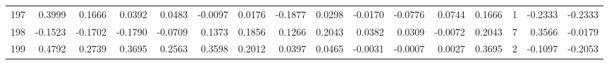\begin{tabular}{lrrrrrrrrrrrrrrr}
197 &      0.3999 &  0.1666 &  0.0392 &  0.0483 & -0.0097 &  0.0176 & -0.1877 &  0.0298 & -0.0170 & -0.0776 &   0.0744 &     0.1666 &      1 &                   -0.2333 &                    -0.2333 \\
198 &     -0.1523 & -0.1702 & -0.1790 & -0.0709 &  0.1373 &  0.1856 &  0.1266 &  0.2043 &  0.0382 &  0.0309 &  -0.0072 &     0.2043 &      7 &                    0.3566 &                    -0.0179 \\
199 &      0.4792 &  0.2739 &  0.3695 &  0.2563 &  0.3598 &  0.2012 &  0.0397 &  0.0465 & -0.0031 & -0.0007 &   0.0027 &     0.3695 &      2 &                   -0.1097 &                    -0.2053 \\
\bottomrule
\end{tabular}
